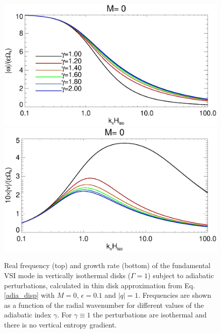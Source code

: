 \begin{figure}
  \includegraphics[width=\linewidth,clip=true,trim=0cm 1.75cm 0cm 0cm]{figures/rate_theory_om}
  \includegraphics[width=\linewidth,clip=true,trim=0cm 0cm 0cm 1cm]{figures/rate_theory_nu}
  \caption{Real frequency (top) and growth rate (bottom) of the fundamental VSI mode in vertically 
    isothermal disks ($\Gamma=1$) subject to adiabatic perturbations,
    calculated in thin disk approximation from Eq. \ref{adia_disp}
    with $M=0$, $\epsilon=0.1$ and  
    $|q|=1$. Frequencies are shown as a function of the radial
    wavenumber for different values of the adiabatic index
    $\gamma$. For $\gamma\equiv 1$ the perturbations are isothermal
    and there is no vertical entropy gradient.\label{adia_growth}}  
\end{figure}   


